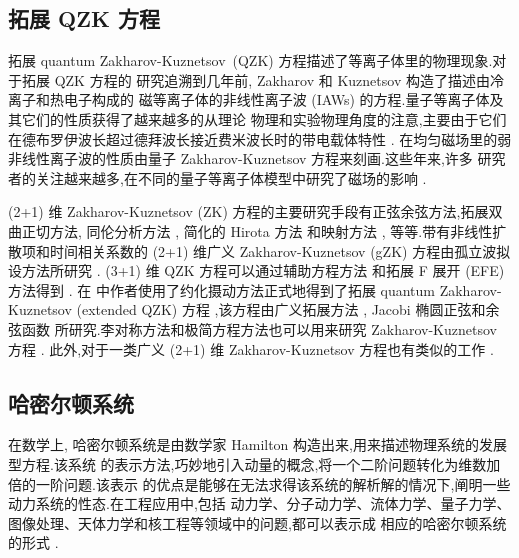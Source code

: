 \subsection{拓展 QZK 方程}

拓展 quantum Zakharov-Kuznetsov~(QZK) 方程描述了等离子体里的物理现象.对于拓展 QZK 方程的
研究追溯到几年前, Zakharov 和 Kuznetsov \cite{abdou2011quant} 构造了描述由冷离子和热电子构成的
磁等离子体的非线性离子波 (IAWs) 的方程.量子等离子体及其它们的性质获得了越来越多的从理论
物理和实验物理角度的注意,主要由于它们在德布罗伊波长超过德拜波长接近费米波长时的带电载体特性 \cite{abdou2011quant,ahmed2013kinks,bhrawy2013soli,biswas20091soli,biswas2013soli,bluman2010appli,elganaini2011tra,godleswski2004the,guner2015bright,ibragimov2006inte}. 在均匀磁场里的弱非线性离子波的性质由量子 Zakharov-Kuznetsov 方程来刻画.这些年来,许多
研究者的关注越来越多,在不同的量子等离子体模型中研究了磁场的影响 \cite{ibragimov2007anew,iwasaki1990cylin,johnpilai2011sym,khan2008linear,krishnan2010sol,leveque1992num,linares2009well,linares2011local,morris2013soli,moslem2007soli,mothibi2015con,moussa2001simi,munro2014con,munro2000sta,mushtaq2005non,olver2000app,peng2008exact,sabry2009non}.

(2+1) 维 Zakharov-Kuznetsov (ZK) 方程的主要研究手段有正弦余弦方法,拓展双曲正切方法,
同伦分析方法 \cite{linares2009well}, 简化的 Hirota 方法 \cite{biswas2013soli,bluman2010appli}
和映射方法 \cite{morris2013soli}, 等等.带有非线性扩散项和时间相关系数的 (2+1) 维广义
Zakharov-Kuznetsov (gZK) 方程由孤立波拟设方法所研究 \cite{sabry2009non}. (3+1) 维 QZK
方程可以通过辅助方程方法 \cite{ahmed2013kinks} 和拓展 F 展开 (EFE) 方法得到 \cite{munro2000sta}.
在 \cite{ahmed2013kinks} 中作者使用了约化摄动方法正式地得到了拓展 quantum Zakharov-Kuznetsov (extended QZK) 方程
,该方程由广义拓展方法 \cite{guner2015bright}, Jacobi 椭圆正弦和余弦函数 \cite{biswas20091soli}
所研究.李对称方法和极简方程方法也可以用来研究 Zakharov-Kuznetsov 方程 \cite{leveque1992num}.
此外,对于一类广义 (2+1) 维 Zakharov-Kuznetsov 方程也有类似的工作 \cite{moslem2007soli}.

\subsection{哈密尔顿系统}

在数学上, 哈密尔顿系统是由数学家 Hamilton 构造出来,用来描述物理系统的发展型方程.该系统
的表示方法,巧妙地引入动量的概念,将一个二阶问题转化为维数加倍的一阶问题.该表示
的优点是能够在无法求得该系统的解析解的情况下,阐明一些动力系统的性态.在工程应用中,包括
动力学、分子动力学、流体力学、量子力学、图像处理、天体力学和核工程等领域中的问题,都可以表示成
相应的哈密尔顿系统的形式 \cite{arieh2009afirst}.

